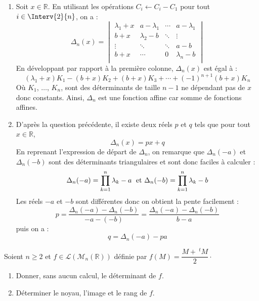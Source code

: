 \documentclass[a4paper,10pt]{report}
\begin{document}
\begin{enumerate}
\item Soit $x \in \mathbb{R}$. En utilisant les opérations $C_i \leftarrow C_i - C_1$ pour tout $i \in \Interv{2}{n}$, on a :
    \[
    \Delta_n(x) =
    \begin{vmatrix}
        {\lambda_1 + x} & a - \lambda_1 & \cdots & a- \lambda_1 \\
        {b + x} & \lambda_2-b & \ddots & \vdots \\
        \vdots & \ddots & \ddots & a-b \\
        {b + x} & \cdots & 0 & \lambda_n-b \\
    \end{vmatrix}    
    \]
En développant par rapport à la première colonne, $\Delta_n(x)$ est égal à :
$$ (\lambda_1+x) K_1 - (b+x) K_2 + (b+x) K_3 + \cdots + (-1)^{n+1} (b+x) K_n$$
Où $K_1$, $\ldots$, $K_n$, sont des déterminants de taille $n-1$ ne dépendant pas de $x$ donc constants. Ainsi, $\Delta_n$ est une fonction affine car somme de fonctions affines.
\item D'après la question précédente, il existe deux réels $p$ et $q$ tels que pour tout $x \in \mathbb{R}$,
$$ \Delta_n(x) = px + q$$
En reprenant l'expression de départ de $\Delta_n$, on remarque que $\Delta_n(-a)$ et $\Delta_n(-b)$ sont des déterminants triangulaires et sont donc faciles à calculer :
$$ \Delta_n(-a) = \prod_{k=1}^n \lambda_k - a \; \hbox{ et } \Delta_n(-b) = \prod_{k=1}^n \lambda_k - b$$
Les réels $-a$ et $-b$ sont différentes donc on obtient la pente facilement :
$$ p = \dfrac{\Delta_n(-a) - \Delta_n(-b)}{-a-(-b)} = \dfrac{\Delta_n(-a) - \Delta_n(-b)}{b-a}$$
puis on a :
$$ q = \Delta_n(-a) -pa$$
\end{enumerate}

\begin{Exa} Soient $n \geq 2$ et $f \in \mathcal{L}(\mathcal{M}_n(\mathbb{R}))$ définie par $f(M) = \dfrac{M+~^tM}{2}\cdot$

\begin{enumerate}
\item Donner, sans aucun calcul, le déterminant de $f$.
\item Déterminer le noyau, l'image et le rang de $f$. 
\end{enumerate}
\end{Exa}

\corr
\end{document}
